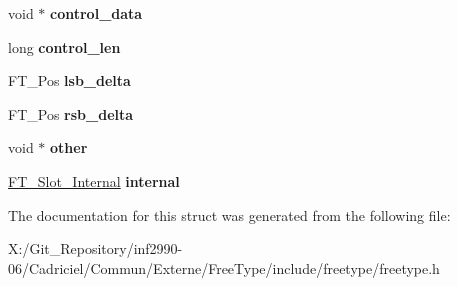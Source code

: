 \begin{DoxyCompactItemize}
\item 
\hypertarget{struct_f_t___glyph_slot_rec___a2af67814d985bcdfcffdf7e8a36ebbdf}{void $\ast$ {\bfseries control\-\_\-data}}\label{struct_f_t___glyph_slot_rec___a2af67814d985bcdfcffdf7e8a36ebbdf}

\item 
\hypertarget{struct_f_t___glyph_slot_rec___a7a088255cb09abe42f19f650f48b6b3f}{long {\bfseries control\-\_\-len}}\label{struct_f_t___glyph_slot_rec___a7a088255cb09abe42f19f650f48b6b3f}

\item 
\hypertarget{struct_f_t___glyph_slot_rec___a7d0d8c2eda28e38541e953186ecab89a}{F\-T\-\_\-\-Pos {\bfseries lsb\-\_\-delta}}\label{struct_f_t___glyph_slot_rec___a7d0d8c2eda28e38541e953186ecab89a}

\item 
\hypertarget{struct_f_t___glyph_slot_rec___a2ca5f5e7b92df3aee4584949fa6a2a1c}{F\-T\-\_\-\-Pos {\bfseries rsb\-\_\-delta}}\label{struct_f_t___glyph_slot_rec___a2ca5f5e7b92df3aee4584949fa6a2a1c}

\item 
\hypertarget{struct_f_t___glyph_slot_rec___ad0c5ab51842f178ba571bab2874f1bdb}{void $\ast$ {\bfseries other}}\label{struct_f_t___glyph_slot_rec___ad0c5ab51842f178ba571bab2874f1bdb}

\item 
\hypertarget{struct_f_t___glyph_slot_rec___a91731fd527eeab1d1acf3e1aea4bea84}{\hyperlink{struct_f_t___slot___internal_rec__}{F\-T\-\_\-\-Slot\-\_\-\-Internal} {\bfseries internal}}\label{struct_f_t___glyph_slot_rec___a91731fd527eeab1d1acf3e1aea4bea84}

\end{DoxyCompactItemize}


The documentation for this struct was generated from the following file\-:\begin{DoxyCompactItemize}
\item 
X\-:/\-Git\-\_\-\-Repository/inf2990-\/06/\-Cadriciel/\-Commun/\-Externe/\-Free\-Type/include/freetype/freetype.\-h\end{DoxyCompactItemize}
